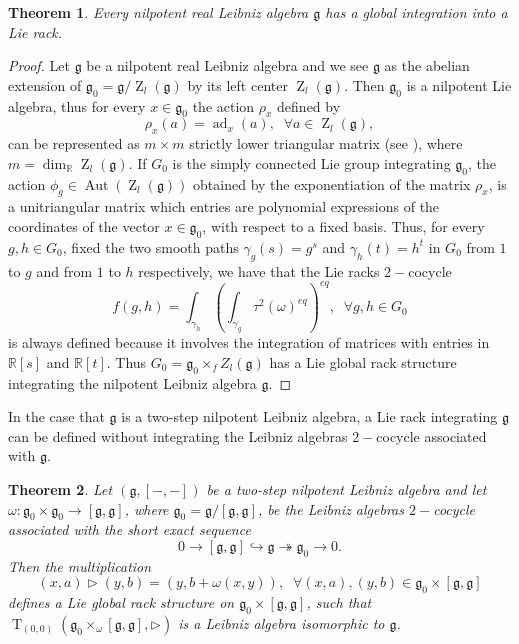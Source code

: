 \documentclass[english,4paper,10pt]{article}
\newcommand{\R}{\mathbb{R}}
\newcommand{\mg}{\mathfrak{g}}
\newtheorem{thm}{Theorem}[section]
\begin{document}
\begin{thm}\label{thmnil}
	Every nilpotent  real Leibniz algebra $\mg$ has a global integration into a Lie rack.
\end{thm}
\begin{proof}

Let $\mg$ be a nilpotent real Leibniz algebra and we see $\mg$ as the abelian extension of $\mg_0=\mg/\operatorname{Z}_l(\mg)$ by its left center $\operatorname{Z}_l(\mg)$. Then $\mg_0$ is a nilpotent Lie algebra, thus for every $x\in\mg_0$ the action $\rho_x$ defined by 
$$
\rho_x(a)=\operatorname{ad}_x(a),\;\;\forall a\in \operatorname{Z}_l(\mg),
$$
can be represented as $m\times m$ strictly lower triangular matrix (see \cite{erdmann2006introduction}), where $m=\dim_\R \operatorname{Z}_l(\mg)$. If $G_0$ is the simply connected Lie group integrating $\mg_0$, the action $\phi_g\in\operatorname{Aut}(\operatorname{Z}_l(\mg))$ obtained by the exponentiation of the matrix $\rho_x$, is a unitriangular matrix which entries are polynomial expressions of the coordinates of the vector $x\in\mg_0$, with respect to a fixed basis. Thus, for every $g,h\in G_0$, fixed the two smooth paths $\gamma_g(s)=g^s$ and $\gamma_h(t)=h^t$ in $G_0$ from $1$ to $g$ and from $1$ to $h$ respectively, we have that the Lie racks $2-$cocycle
$$
f(g,h)=\int_{\gamma_h}\left(\int_{\gamma_g}\tau^2(\omega)^{eq}\right)^{eq},\;\;\forall g,h\in G_0
$$
is always defined because it involves the integration of matrices with entries in $\mathbb{R}[s]$ and $\mathbb{R}[t]$. Thus \hbox{$G_0=\mg_0\times_f Z_l(\mg)$} has a Lie global rack structure integrating the nilpotent Leibniz algebra $\mg$.
\end{proof}

In the case that $\mg$ is a two-step nilpotent Leibniz algebra, a Lie rack integrating $\mg$ can be defined without integrating the Leibniz algebras $2-$cocycle associated with $\mg$. 

\begin{thm} \label{thm2}
	Let $(\mg,[-,-])$ be a two-step nilpotent Leibniz algebra and let $\omega\colon \mg_0 \times \mg_0 \rightarrow \left[\mg,\mg\right]$, where $\mg_0=\mg / \left[\mg,\mg\right]$, be the Leibniz algebras $2-$cocycle associated with the short exact sequence
	$$
	0\rightarrow \left[\mg,\mg\right] \hookrightarrow \mg \twoheadrightarrow \mg_0 \rightarrow 0.
	$$
	Then the multiplication
	$$
	\left(x,a\right)\rhd\left(y,b\right)=\left(y,b+\omega(x,y)\right),\;\;\forall \left(x,a\right),\left(y,b\right)\in \mg_0\times\left[\mg,\mg\right]
	$$
	defines a Lie global rack structure on $\mg_0\times \left[\mg,\mg\right]$, such that $\operatorname{T}_{(0,0)}(\mg_0\times_{\omega} \left[\mg,\mg\right], \rhd)$ is a Leibniz algebra isomorphic to $\mg$.
\end{thm}
\end{document}
